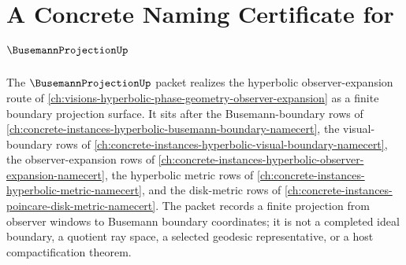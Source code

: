 \chapter{A Concrete Naming Certificate for $\BusemannProjectionUp$}
\label{ch:concrete-instances-busemann-projection-namecert}

The $\BusemannProjectionUp$ packet realizes the hyperbolic observer-expansion route of \autoref{ch:visions-hyperbolic-phase-geometry-observer-expansion} as a finite boundary projection surface. It sits after the Busemann-boundary rows of \autoref{ch:concrete-instances-hyperbolic-busemann-boundary-namecert}, the visual-boundary rows of \autoref{ch:concrete-instances-hyperbolic-visual-boundary-namecert}, the observer-expansion rows of \autoref{ch:concrete-instances-hyperbolic-observer-expansion-namecert}, the hyperbolic metric rows of \autoref{ch:concrete-instances-hyperbolic-metric-namecert}, and the disk-metric rows of \autoref{ch:concrete-instances-poincare-disk-metric-namecert}. The packet records a finite projection from observer windows to Busemann boundary coordinates; it is not a completed ideal boundary, a quotient ray space, a selected geodesic representative, or a host compactification theorem.

